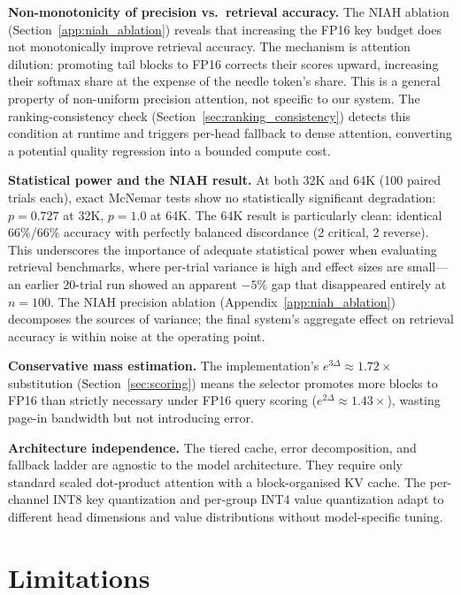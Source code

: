 \documentclass[10pt,twocolumn,a4paper]{article}
\theoremstyle{definition}
\theoremstyle{remark}
\begin{document}
\textbf{Non-monotonicity of precision vs.\ retrieval accuracy.}  The NIAH ablation (Section~\ref{app:niah_ablation}) reveals that increasing the FP16 key budget does not monotonically improve retrieval accuracy.  The mechanism is attention dilution: promoting tail blocks to FP16 corrects their scores upward, increasing their softmax share at the expense of the needle token's share.  This is a general property of non-uniform precision attention, not specific to our system.  The ranking-consistency check (Section~\ref{sec:ranking_consistency}) detects this condition at runtime and triggers per-head fallback to dense attention, converting a potential quality regression into a bounded compute cost.

\textbf{Statistical power and the NIAH result.}  At both 32K and 64K (100 paired trials each), exact McNemar tests show no statistically significant degradation: $p{=}0.727$ at 32K, $p{=}1.0$ at 64K.  The 64K result is particularly clean: identical 66\%/66\% accuracy with perfectly balanced discordance (2 critical, 2 reverse).  This underscores the importance of adequate statistical power when evaluating retrieval benchmarks, where per-trial variance is high and effect sizes are small---an earlier 20-trial run showed an apparent $-5\%$ gap that disappeared entirely at $n{=}100$.  The NIAH precision ablation (Appendix~\ref{app:niah_ablation}) decomposes the sources of variance; the final system's aggregate effect on retrieval accuracy is within noise at the operating point.

\textbf{Conservative mass estimation.}  The implementation's $e^{3\Delta} \approx 1.72\times$ substitution (Section~\ref{sec:scoring}) means the selector promotes more blocks to FP16 than strictly necessary under FP16 query scoring ($e^{2\Delta} \approx 1.43\times$), wasting page-in bandwidth but not introducing error.

\textbf{Architecture independence.}  The tiered cache, error decomposition, and fallback ladder are agnostic to the model architecture.  They require only standard scaled dot-product attention with a block-organised KV cache.  The per-channel INT8 key quantization and per-group INT4 value quantization adapt to different head dimensions and value distributions without model-specific tuning.


\section{Limitations}
\label{sec:limitations}
\end{document}
